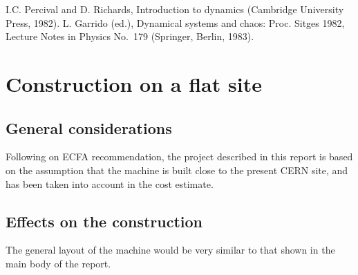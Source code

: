 \documentclass{cernphprep}
\begin{document}
I.C. Percival and D. Richards, Introduction to dynamics (Cambridge 
University Press, 1982).\newline
L. Garrido (ed.), Dynamical systems and chaos: Proc. Sitges 1982, 
Lecture Notes in Physics No.~179 (Springer, Berlin, 1983).

\appendix
\section{Construction on a flat site}
\label{sec:app}

\subsection{General considerations}

Following on ECFA recommendation, the project described in this 
report is based on the assumption that the machine is built close 
to the present CERN site, and has been taken into account in 
the cost estimate.

\subsection{Effects on the construction}

The general layout of the machine would be very similar to that 
shown in the main body of the report.
\end{document}
